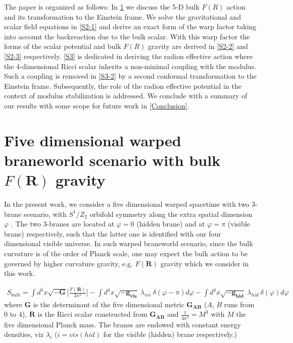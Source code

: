 \documentclass{article}
\begin{document}
The paper is organized as follows: In \ref{sectionFR} we discuss the 5-D bulk $F(R)$ action and its transformation to the Einstein frame. We solve the gravitational and scalar field equations in \ref{S2-1} and derive an exact form of the warp factor taking into account the backreaction due to the bulk scalar. With this warp factor the forms of the scalar potential and bulk $F(R)$ gravity are derived in \ref{S2-2} and \ref{S2-3} respectively. \ref{S3} is dedicated in deriving the radion effective action where the 4-dimensional Ricci scalar inherits a non-minimal coupling with the modulus. Such a coupling is removed in \ref{S3-2} by a second conformal transformation to the Einstein frame. Subsequently, the role of the radion effective potential in the context of modulus stabilization is addressed. We conclude with a summary of our results with some scope for future work in \ref{Conclusion}.





\section{Five dimensional warped braneworld scenario with bulk $F(\mathbf{R})$ gravity}
\label{sectionFR}
In the present work, we consider a five dimensional warped spacetime with two 3-brane scenario, with $S^1/Z_2$ orbifold symmetry along the extra spatial 
dimension $\varphi$ \cite{Randall:1999ee}. The two 3-branes are located at $\varphi = 0$ (hidden brane) and at 
$\varphi = \pi$ (visible brane) respectively, such that the latter one is identified with our four dimensional visible universe. In such warped braneworld scenario, since the bulk curvature is of the order of Planck scale, one may expect the bulk action to be governed by higher curvature gravity, e.g. $F(\mathbf{R})$ gravity which we consider in this work.
 
\begin{eqnarray}
 S_{bulk} = \int d^5x \sqrt{-\mathbf{G}}\bigg[\frac{F(\mathbf{R})}{2\kappa^2}\bigg] - \int d^4 x \sqrt{-\mathbf{g_{vis}}}~\lambda_{vis} ~\delta(\varphi-\pi) d\varphi- \int d^4 x \sqrt{-\mathbf{g_{hid}}} ~\lambda_{hid}~ \delta(\varphi) d\varphi
 \label{transformation1}
\end{eqnarray}
where $\mathbf{G}$ is the determinant of the five dimensional metric $\mathbf{G_{AB}}$ ($A$, $B$ runs from $0$ to $4$), $\mathbf{R}$ is the Ricci scalar constructed from $\mathbf{G_{AB}}$ and 
$\frac{1}{4\kappa^2} = M^{3}$ with $M$ the five dimensional Planck mass. The branes are endowed with constant energy densities, viz $\lambda_i$ ($i=vis(hid)$ for the visible (hidden) brane respectively.) 
\end{document}
